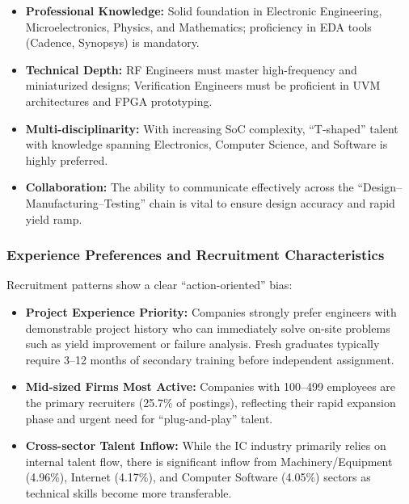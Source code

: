 \documentclass[12pt,a4paper]{article}
\begin{document}
\begin{itemize}
    \item \textbf{Professional Knowledge:} Solid foundation in Electronic
          Engineering, Microelectronics, Physics, and Mathematics; proficiency
          in EDA tools (Cadence, Synopsys) is mandatory.
    \item \textbf{Technical Depth:} RF Engineers must master high-frequency
          and miniaturized designs; Verification Engineers must be proficient
          in UVM architectures and FPGA prototyping.
    \item \textbf{Multi-disciplinarity:} With increasing SoC complexity,
          ``T-shaped'' talent with knowledge spanning Electronics, Computer
          Science, and Software is highly preferred.
    \item \textbf{Collaboration:} The ability to communicate effectively across
          the ``Design--Manufacturing--Testing'' chain is vital to ensure design
          accuracy and rapid yield ramp.
\end{itemize}

\subsubsection{Experience Preferences and Recruitment Characteristics}

Recruitment patterns show a clear ``action-oriented'' bias:

\begin{itemize}
    \item \textbf{Project Experience Priority:} Companies strongly prefer
          engineers with demonstrable project history who can immediately
          solve on-site problems such as yield improvement or failure analysis.
          Fresh graduates typically require 3--12 months of secondary training
          before independent assignment.
    \item \textbf{Mid-sized Firms Most Active:} Companies with 100--499
          employees are the primary recruiters (25.7\% of postings),
          reflecting their rapid expansion phase and urgent need for
          ``plug-and-play'' talent.
    \item \textbf{Cross-sector Talent Inflow:} While the IC industry primarily
          relies on internal talent flow, there is significant inflow from
          Machinery/Equipment (4.96\%), Internet (4.17\%), and Computer
          Software (4.05\%) sectors as technical skills become more transferable.
\end{itemize}
\end{document}
